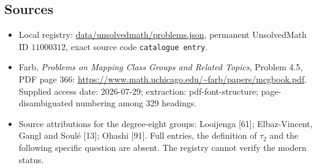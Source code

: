 \documentclass[11pt]{article}
\begin{document}
\subsection{Sources}
\begin{itemize}
\item Local registry: \url{data/unsolvedmath/problems.json}, permanent UnsolvedMath ID $11000312$, exact source code \texttt{catalogue entry}.
\item Farb, \emph{Problems on Mapping Class Groups and Related Topics}, Problem 4.5, PDF page 366: \url{https://www.math.uchicago.edu/~farb/papers/mcgbook.pdf}. Supplied access date: 2026-07-29; extraction: pdf-font-structure; page-disambiguated numbering among 329 headings.
\item Source attributions for the degree-eight groups: Looijenga [61]; Elbaz-Vincent, Gangl and Soul\'e [13]; Ohashi [91]. Full entries, the definition of $\tau_2$ and the following specific question are absent. The registry cannot verify the modern status.
\end{itemize}
\end{document}
